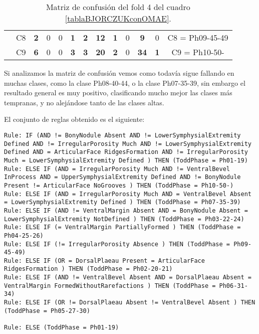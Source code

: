 \begin{table}[H]
{\begin{tabular}{|ccccccccccccc|}
\multicolumn{1}{|c|}{}                                      & \multicolumn{1}{c|}{C8} & \multicolumn{1}{c|}{\textbf{2}} & \multicolumn{1}{c|}{0}          & \multicolumn{1}{c|}{0}          & \multicolumn{1}{c|}{\textbf{1}} & \multicolumn{1}{c|}{\textbf{2}} & \multicolumn{1}{c|}{\textbf{12}} & \multicolumn{1}{c|}{\textbf{1}} & \multicolumn{1}{c|}{0}  & \multicolumn{1}{c|}{\textbf{9}}  & \multicolumn{1}{c|}{0}          & C8 = Ph09-45-49   \\ \cline{2-13}
\multicolumn{1}{|c|}{}                                      & \multicolumn{1}{c|}{C9} & \multicolumn{1}{c|}{\textbf{6}} & \multicolumn{1}{c|}{0}          & \multicolumn{1}{c|}{0}          & \multicolumn{1}{c|}{\textbf{3}} & \multicolumn{1}{c|}{\textbf{3}} & \multicolumn{1}{c|}{\textbf{20}} & \multicolumn{1}{c|}{\textbf{2}} & \multicolumn{1}{c|}{0}  & \multicolumn{1}{c|}{\textbf{34}} & \multicolumn{1}{c|}{\textbf{1}} & C9 = Ph10-50-     \\ \hline
\end{tabular}%
}
\caption{Matriz de confusión del fold 4 del cuadro \ref{tablaBJORCZUKconOMAE}.}
\end{table}

Si analizamos la matriz de confusión vemos como todavía sigue fallando en muchas clases, como la clase Ph08-40-44, o la clase Ph07-35-39, sin embargo el resultado general es muy positivo, clasificando mucho mejor las clases más tempranas, y no alejándose tanto de las clases altas.

El conjunto de reglas obtenido es el siguiente:

\begin{lstlisting}
Rule: IF (AND != BonyNodule Absent AND != LowerSymphysialExtremity Defined AND != IrregularPorosity Much AND != LowerSymphysialExtremity Defined AND = ArticularFace RidgesFormation AND != IrregularPorosity Much = LowerSymphysialExtremity Defined ) THEN (ToddPhase = Ph01-19)
Rule: ELSE IF (AND = IrregularPorosity Much AND != VentralBevel InProcess AND = UpperSymphysialExtremity Defined AND != BonyNodule Present != ArticularFace NoGrooves ) THEN (ToddPhase = Ph10-50-)
Rule: ELSE IF (AND = IrregularPorosity Much AND = VentralBevel Absent = LowerSymphysialExtremity Defined ) THEN (ToddPhase = Ph07-35-39)
Rule: ELSE IF (AND != VentralMargin Absent AND = BonyNodule Absent = LowerSymphysialExtremity NotDefined ) THEN (ToddPhase = Ph03-22-24)
Rule: ELSE IF (= VentralMargin PartiallyFormed ) THEN (ToddPhase = Ph04-25-26)
Rule: ELSE IF (!= IrregularPorosity Absence ) THEN (ToddPhase = Ph09-45-49)
Rule: ELSE IF (OR = DorsalPlaeau Present = ArticularFace RidgesFormation ) THEN (ToddPhase = Ph02-20-21)
Rule: ELSE IF (AND != VentralBevel Absent AND = DorsalPlaeau Absent = VentralMargin FormedWithoutRarefactions ) THEN (ToddPhase = Ph06-31-34)
Rule: ELSE IF (OR != DorsalPlaeau Absent != VentralBevel Absent ) THEN (ToddPhase = Ph05-27-30)

Rule: ELSE (ToddPhase = Ph01-19)
\end{lstlisting}


